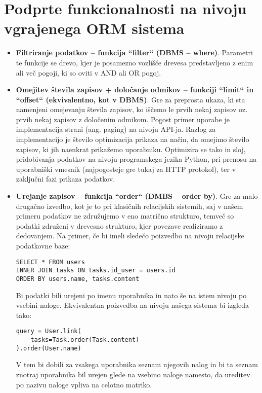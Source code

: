\documentclass[a4paper,12pt,openright]{book}
\begin{document}
    \section{Podprte funkcionalnosti na nivoju vgrajenega ORM sistema}
    \begin{itemize}
        \item \textbf{Filtriranje podatkov – funkcija ``filter`` (DBMS – where)}. Parametri te funkcije se drevo, kjer je posamezno vozlišče drevesa predstavljeno z enim ali več pogoji, ki so oviti v AND ali OR pogoj.
        \item \textbf{Omejitev števila zapisov + določanje odmikov – funkciji ``limit`` in ``offset`` (ekvivalentno, kot v DBMS)}. Gre za preprosta ukaza, ki sta namenjeni omejevanju števila zapisov, ko iščemo le prvih nekaj zapisov oz. prvih nekaj zapisov z določenim odmikom. Pogost primer uporabe je implementacija strani (ang. paging) na nivoju API-ja. Razlog za implementacijo je število optimizacija prikaza na način, da omejimo število zapisov, ki jih naenkrat prikažemo uporabniku. Optimizira se tako in sloj, pridobivanja podatkov na nivoju programskega jezika Python, pri prenosu na uporabniški vmesnik (najpogosteje gre tukaj za HTTP protokol), ter v zaključni fazi prikaza podatkov.
        \item \textbf{Urejanje zapisov – funkcija ``order`` (DMBS – order by)}. Gre za malo drugačno izvedbo, kot je to pri klasičnih relacijskih sistemih, saj v našem primeru podatkov ne združujemo v eno matrično strukturo, temveč so podatki združeni v drevesno strukturo, kjer povezave realiziramo z dedovanjem. Na primer, če bi imeli sledečo poizvedbo na nivoju relacijske podatkovne baze:

\begin{verbatim}
SELECT * FROM users
INNER JOIN tasks ON tasks.id_user = users.id
ORDER BY users.name, tasks.content
\end{verbatim}

        Bi podatki bili urejeni po imenu uporabnika in nato še na istem nivoju po vsebini naloge. Ekvivalentna poizvedba na nivoju našega sistema bi izgleda tako:

\begin{verbatim}
query = User.link(
    tasks=Task.order(Task.content)
).order(User.name)
\end{verbatim}

        V tem bi dobili za vsakega uporabnika seznam njegovih nalog in bi ta seznam znotraj uporabnika bil urejen glede na vsebino naloge namesto, da ureditev po nazivu naloge vpliva na celotno matriko.
        

\end{itemize}
\end{document}
